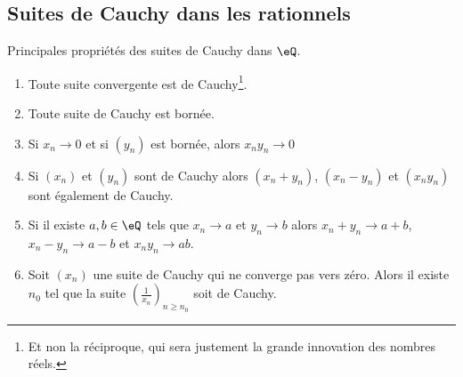 \subsection{Suites de Cauchy dans les rationnels}

\begin{proposition}        \label{PropFFDJooAapQlP}
	Principales propriétés des suites de Cauchy dans \( \eQ\).
	\begin{enumerate}
		\item       \label{ItemRKCIooJguHdji}
		      Toute suite convergente est de Cauchy\footnote{Et non la réciproque, qui sera justement la grande innovation des nombres réels.}.
		\item       \label{ItemRKCIooJguHdjii}
		      Toute suite de Cauchy est bornée.
		\item       \label{ItemRKCIooJguHdjiii}
		      Si \( x_n\to 0\) et si \( (y_n)\) est bornée, alors \( x_ny_n\to 0\)
		\item
		      Si \( (x_n)\) et \( (y_n)\) sont de Cauchy alors \( (x_n+y_n)\), \( (x_n-y_n)\) et \( (x_ny_n)\) sont également de Cauchy.
		\item       \label{ITEMooIAFSooAIUpAN}
		      Si il existe \( a,b\in \eQ\) tels que \( x_n\to a \) et \( y_n\to b \) alors \( x_n+y_n\to a+b\), \( x_n-y_n\to a-b\) et \(  x_ny_n\to ab  \).
		\item   \label{ItemRKCIooJguHdjvi}
		      Soit \( (x_n)\) une suite de Cauchy qui ne converge pas vers zéro. Alors il existe \( n_0\) tel que la suite \( \left( \frac{1}{ x_n } \right)_{n\geq n_0}\) soit de Cauchy.
	\end{enumerate}
\end{proposition}

